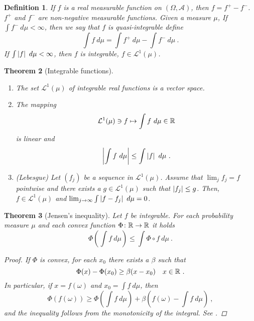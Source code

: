 \documentclass[12pt,a4paper]{amsart}
\theoremstyle{plain}
\newtheorem{theorem}{Theorem}%
\newtheorem{definition}[theorem]{Definition}%
\theoremstyle{definition}
\theoremstyle{remark}
\begin{document}
\begin{definition}
  If $f$ is a real measurable function on $(\Omega,\mathcal A)$, then
  $f = f^+ - f^-$. $f^+$ and $f^-$ are non-negative measurable
  functions. Given a measure $\mu$, If $\int f^- \ d\mu < \infty$,
  then we say that $f$ is \emph{quasi-integrable} define
  \begin{equation*}
    \int f \ d\mu = \int f^+ \ d\mu - \int f^- \ d\mu \ .
  \end{equation*}
If $\int \left\vert f\right\vert \ d\mu < \infty$, then $f$ is \emph{integrable}, $f
\in \mathcal L^1(\mu)$.
\end{definition}

\begin{theorem}[Integrable functions]\
  \begin{enumerate}
  \item The set $\mathcal L^1(\mu)$ of integrable real functions is a
    vector space.
  \item The mapping
    \begin{equation*}
      \mathcal L^1(\mu) \ni f \mapsto \int f \ d\mu \in \mathbb{R}
    \end{equation*}
is linear and
\begin{equation*}
  \left\vert\int f \ d\mu\right\vert \leq \int \left\vert f\right\vert \ d\mu \ .
\end{equation*}
\item (\emph{Lebesgue}) Let $(f_j)$ be a sequence in $\mathcal
  L^1(\mu)$. Assume that $\lim_j f_j = f$ pointwise and there exists a
  $g \in \mathcal L^1(\mu)$ such that $\left\vert f_j\right\vert \leq g$. Then, $f
  \in \mathcal L^1(\mu)$ and $\lim_{j\to\infty} \int \left\vert f - f_j\right\vert
  \ d\mu = 0$. 
  \end{enumerate}

\end{theorem}
\begin{theorem}[Jensen's inequality]
  Let $f$ be integrable. For each probability measure $\mu$ and
  each convex function $\Phi \colon \mathbb{R} \to \mathbb{R}$ it holds
  \begin{equation*}
    \Phi\left(\int f \ d\mu\right) \leq \int \Phi\circ f \ d\mu \ .
  \end{equation*}
  \begin{proof}
    If $\Phi$ is convex, for each $x_0$ there exists a $\beta$ such that
    \begin{equation*}
      \Phi(x) - \Phi(x_0) \geq \beta(x - x_0) \quad x \in \mathbb{R} \ .
    \end{equation*}
In particular, if $x = f(\omega)$ and $x_0 = \int f \ d\mu$, then
\begin{equation*}
  \Phi\left(f(\omega)\right) \geq \Phi\left( \int f \ d\mu\right) +
  \beta\left(f(\omega) - \int f \ d\mu\right) \ , 
\end{equation*}
and the inequality follows from the monotonicity of the integral. See
\cite[Th. 3.3]{rudin:1987-3rd}.
  \end{proof}
\end{theorem}
\end{document}
